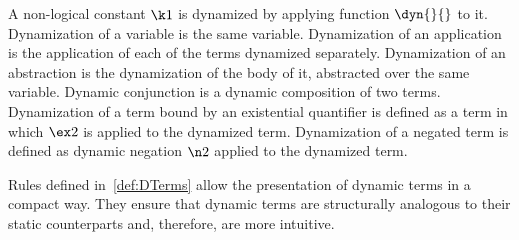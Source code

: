 A non-logical constant $\k1$ is dynamized by applying function $\dyn{}{}$ to it. Dynamization of a variable is the same variable. Dynamization of an application is the application of each of the terms dynamized separately. Dynamization of an abstraction is the dynamization of the body of it, abstracted over the same variable. Dynamic conjunction is a dynamic composition of two terms. Dynamization of a term bound by an existential quantifier is defined as a term in which $\ex2$ is applied to the dynamized term. Dynamization of a negated term is defined as dynamic negation $\n2$ applied to the dynamized term.

 Rules defined in~\ref{def:DTerms} allow the presentation of dynamic terms in a compact way. They ensure that dynamic terms are structurally analogous to their static counterparts and, therefore, are more intuitive.


